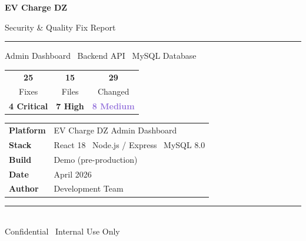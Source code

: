 \documentclass[12pt,a4paper]{report}
\begin{document}
	
	\begin{titlepage}
		\centering
		\vspace*{2.5cm}
		
		{\fontsize{42}{50}\selectfont\bfseries\color{brandblue} EV Charge DZ}
		
		\vspace{0.5cm}
		{\LARGE Security \& Quality Fix Report}
		
		\vspace{0.3cm}
		\textcolor{midblue}{\rule{0.6\linewidth}{1pt}}
		
		\vspace{0.5cm}
		{\large\color{labelgray} Admin Dashboard \textbullet\ Backend API \textbullet\ MySQL Database}
		
		\vspace{2cm}
		
		\begin{tcolorbox}[
			colback  = lightblue,
			colframe = midblue,
			arc      = 6pt,
			width    = 0.72\linewidth,
			left     = 14pt, right = 14pt, top = 12pt, bottom = 12pt,
			]
			\centering
			\begin{tabular}{ccc}
				\textbf{\fontsize{32}{36}\selectfont\color{brandblue}25}  &
				\textbf{\fontsize{32}{36}\selectfont\color{brandblue}15}  &
				\textbf{\fontsize{32}{36}\selectfont\color{brandblue}29}  \\[2pt]
				\color{labelgray}Fixes & \color{labelgray}Files & \color{labelgray}Changed
				\\[10pt]
				\textcolor{criticalred}{\large\textbf{4 Critical}} &
				\textcolor{highorange}{\large\textbf{7 High}} &
				\textcolor{mediumpurple}{\large\textbf{8 Medium}}
			\end{tabular}
		\end{tcolorbox}
		
		\vspace{2cm}
		
		\begin{tabular}{ll}
			\textbf{Platform}  & EV Charge DZ Admin Dashboard \\[4pt]
			\textbf{Stack}     & React 18 \textbullet\ Node.js / Express \textbullet\ MySQL 8.0 \\[4pt]
			\textbf{Build}     & Demo (pre-production) \\[4pt]
			\textbf{Date}      & April 2026 \\[4pt]
			\textbf{Author}    & Development Team \\
		\end{tabular}
		
		\vfill
		\textcolor{midblue}{\rule{0.6\linewidth}{0.5pt}}\\[6pt]
		{\small\color{labelgray} Confidential \textbullet\ Internal Use Only}
	\end{titlepage}
	
\end{document}
